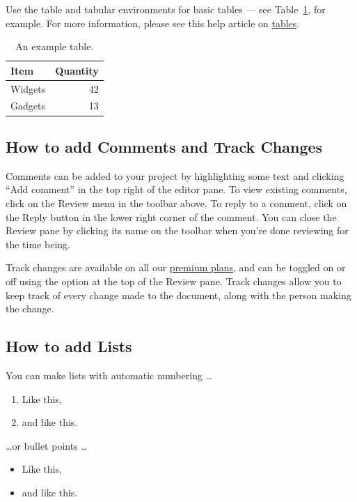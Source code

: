 \documentclass[twocolumn]{article}
\begin{document}
Use the table and tabular environments for basic tables --- see Table~\ref{tab:widgets}, for example. For more information, please see this help article on \href{https://www.overleaf.com/learn/latex/tables}{tables}.

\begin{table}
\centering
\begin{tabular}{l|r}
Item & Quantity \\\hline
Widgets & 42 \\
Gadgets & 13
\end{tabular}
\caption{\label{tab:widgets}An example table.}
\end{table}

\subsection{How to add Comments and Track Changes}

Comments can be added to your project by highlighting some text and clicking ``Add comment'' in the top right of the editor pane. To view existing comments, click on the Review menu in the toolbar above. To reply to a comment, click on the Reply button in the lower right corner of the comment. You can close the Review pane by clicking its name on the toolbar when you're done reviewing for the time being.

Track changes are available on all our \href{https://www.overleaf.com/user/subscription/plans}{premium plans}, and can be toggled on or off using the option at the top of the Review pane. Track changes allow you to keep track of every change made to the document, along with the person making the change.

\subsection{How to add Lists}

You can make lists with automatic numbering \dots

\begin{enumerate}
\item Like this,
\item and like this.
\end{enumerate}
\dots or bullet points \dots
\begin{itemize}
\item Like this,
\item and like this.
\end{itemize}
\end{document}
